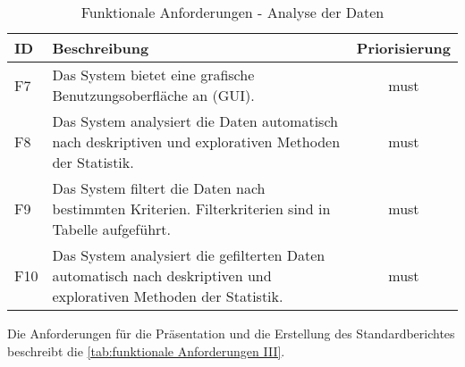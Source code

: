 \begingroup
\setlength{\tabcolsep}{10pt} %
\renewcommand{\arraystretch}{1.25} 
\begin{table}[h]
    \centering
    \begin{adjustbox}{max width=\textwidth}
    \begin{tabular}{lp{13cm}c}
       \toprule
       \textbf{ID}          & \textbf{Beschreibung} &\textbf{Priorisierung}\\
       \midrule
        F7                               &Das System bietet eine grafische Benutzungsoberfläche an (GUI).  & must\\
        F8                               &Das System analysiert die Daten automatisch nach deskriptiven und explorativen Methoden der Statistik.  & must\\
        F9                               &Das System filtert die Daten nach bestimmten Kriterien. Filterkriterien sind in Tabelle aufgeführt. & must\\
        F10                              &Das System analysiert die gefilterten Daten automatisch nach deskriptiven und explorativen Methoden der Statistik. & must\\
        \bottomrule
    \end{tabular}
    \end{adjustbox}
    \caption{%
        Funktionale Anforderungen - Analyse der Daten
    }
    \label{tab:funktionale Anforderungen II}
    \end{table}
\endgroup

Die Anforderungen für die Präsentation und die Erstellung des Standardberichtes beschreibt die \autoref{tab:funktionale Anforderungen III}.

